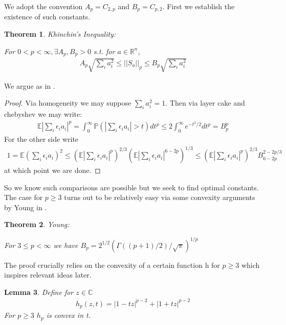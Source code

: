 \documentclass[10pt]{article}
\newcommand{\Pp}{\mathbb{P}}
\newcommand{\E}{\mathbb{E}}
\newcommand{\1}{\textbf{1}}
\newcommand{\R}{\mathbb{R}}
\newcommand{\C}{\mathbb{C}}
\newcommand{\norm}[1]{||#1||}
\newtheorem{theorem}{Theorem}
\newtheorem{lemma}[theorem]{Lemma}
\theoremstyle{remark}
\theoremstyle{definition}
\begin{document}
We adopt the convention $A_p = C_{2,p}$ and $B_p = C_{p,2}$. First we establish the existence of such constants. 

\begin{theorem}Khinchin's Inequality:
	
	For $0 < p < \infty, \exists A_p,B_p > 0$ s.t. for $a \in \R^n$,
	\begin{align*}
		A_p\sqrt{\sum_i a_i^2} \leq \norm{S_a}_p \leq B_p \sqrt{\sum_i a_i^2}
	\end{align*}
\end{theorem}

We argue as in \cite{LT}.

\begin{proof}
	Via homogeneity we may suppose $\sum_i a_i^2 = 1$. Then via layer cake and chebyshev we may write:
	\begin{align*}
		\E |\sum_i \epsilon_i a_i|^p = \int_0^{\infty} \Pp(|\sum_i \epsilon_i a_i | > t) dt^p \leq 2 \int_0^{\infty} e^{-t^2/2}dt^p = B_p^p
	\end{align*}
	For the other side write
	\begin{align*}
		1 = \E(\sum_i \epsilon_i a_i)^2 \leq (\E |\sum_i \epsilon_i a_i|^p)^{2/3}(\E |\sum_i \epsilon_i a_i|^{6-2p})^{1/3} \leq (\E|\sum_i \epsilon_i a_i|^p)^{2/3} B_{6-2p}^{2-2p/3}
	\end{align*}
	at which point we are done.
\end{proof}


So we know such comparisons are possible but we seek to find optimal constants. The case for $p \geq 3$ turns out to be relatively easy via some convexity arguments by Young in \cite{Y}. 


\begin{theorem}Young:

For $3 \leq p < \infty$ we have $B_p = 2^{1/2}(\Gamma((p+1)/2)/\sqrt{\pi})^{1/p}$	
\end{theorem}

The proof crucially relies on the convexity of a certain function h for $p \geq 3$ which inspires relevant ideas later. 

\begin{lemma}
	Define for $z \in \C$
	\begin{align*}
		h_p(z,t) = |1-tz|^{p-2} + |1+tz|^{p-2} 
	\end{align*}
	For $p \geq 3$ $h_p$ is convex in t.
\end{lemma}
\end{document}
